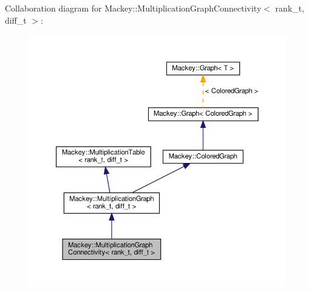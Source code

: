 Collaboration diagram for Mackey\+:\+:Multiplication\+Graph\+Connectivity$<$ rank\+\_\+t, diff\+\_\+t $>$\+:\nopagebreak
\begin{figure}[H]
\begin{center}
\leavevmode
\includegraphics[width=350pt]{classMackey_1_1MultiplicationGraphConnectivity__coll__graph}
\end{center}
\end{figure}
